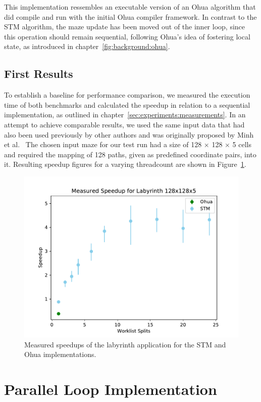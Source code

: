 This implementation ressembles an executable version of an Ohua algorithm that did compile and run with the initial Ohua compiler framework.
In contrast to the STM algorithm, the maze update has been moved out of the inner loop, since this operation should remain sequential, following Ohua's idea of fostering local state, as introduced in chapter~\ref{fig:background:ohua}.

\subsection{First Results}

To establish a baseline for performance comparison, we measured the execution time of both benchmarks and calculated the speedup in relation to a sequential implementation, as outlined in chapter~\ref{sec:experiments:measurements}.
In an attempt to achieve comparable results, we used the same input data that had also been used previously by other authors and was originally proposed by Minh et al.~\cite{minh2008stamp}
The chosen input maze for our test run had a size of 128 $\times$ 128 $\times$ 5 cells and required the mapping of 128 paths, given as predefined coordinate pairs, into it.
Resulting speedup figures for a varying threadcount are shown in Figure~\ref{fig:preliminaries:initial-results}.

\begin{figure}[h]
    \centering
    \includegraphics[width=.6\textwidth,keepaspectratio]{gfx/preliminaries-labyrinth/2019-04-18-128x128x5}
    \caption{Measured speedups of the labyrinth application for the STM and Ohua implementations.}%
    \label{fig:preliminaries:initial-results}
\end{figure}



\section{Parallel Loop Implementation}

